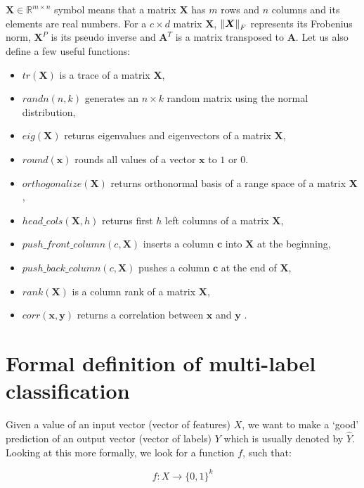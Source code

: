 \documentclass[english,a4paper,twoside]{ppfcmthesis}
\begin{document}
$\boldsymbol{X} \in \mathbb{R}^{m \times n}$ symbol means that a matrix $\boldsymbol{X}$ has $m$ rows and $n$ columns and its elements are real numbers. For a $c \times d$  matrix $\boldsymbol{X}$, $\left\lVert\boldsymbol{X}\right\rVert_{F}$ represents its Frobenius norm, $\boldsymbol{X}^P$ is its pseudo inverse and $\boldsymbol{A}^T$ is a matrix transposed to $\boldsymbol{A}$. 
Let us also define a few useful functions:
\begin{itemize}
\item $tr(\boldsymbol{X})$ is a trace of a matrix $\boldsymbol{X}$, 
\item $randn(n,k)$ generates an $n \times k$ random matrix using the normal distribution,
\item $eig(\boldsymbol{X})$ returns eigenvalues and eigenvectors of a matrix $\boldsymbol{X}$,
\item $round(\boldsymbol{x})$ rounds all values of a vector $\boldsymbol{x}$ to $1$ or $0$.
\item $orthogonalize(\boldsymbol{X})$ returns orthonormal basis of a range space of a matrix $\boldsymbol{X}$,
\item $head\_cols(\boldsymbol{X},h)$ returns first $h$ left columns of a matrix $\boldsymbol{X}$,
\item $push\_front\_column(c,\boldsymbol{X})$ inserts a column $\boldsymbol{c}$ into $\boldsymbol{X}$ at the beginning,
\item $push\_back\_column(c,\boldsymbol{X})$ pushes a column $\boldsymbol{c}$ at the end of $\boldsymbol{X}$,
\item $rank(\boldsymbol{X})$ is a column rank of a matrix $\boldsymbol{X}$,
\item $corr(\boldsymbol{x},\boldsymbol{y})$ returns a correlation between $\boldsymbol{x}$ and $\boldsymbol{y}$ . 

\end{itemize}

\section{Formal definition of multi-label classification}

Given a value of an input vector (vector of features) $X$, we want to make a `good' prediction of an output vector (vector of labels) $Y$ which is usually denoted by $\hat{Y}$. Looking at this more formally, we look for a function $f$, such that:   

\begin{equation}\label{eq:def}
    f: X \rightarrow \{0,1\}^k 
\end{equation}
\end{document}
